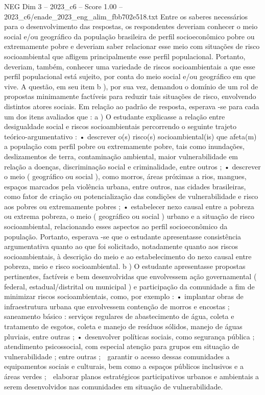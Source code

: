 \begin{textsample}{NEG Dim 3 – 2023\_c6 – Score 1.00 – 2023\_c6/enade\_2023\_eng\_alim\_fbb702e518.txt}
Entre os saberes necessários para o desenvolvimento das respostas, os respondentes deveriam conhecer o meio social e/ou geográfico da população brasileira de perfil socioeconômico pobre ou extremamente pobre e deveriam saber relacionar esse meio com situações de risco socioambiental que afligem principalmente esse perfil populacional.
Portanto, deveriam, também, conhecer uma variedade de riscos socioambientais a que esse perfil populacional está sujeito, por conta do meio social e/ou geográfico em que vive.
A questão, em seu item b ), por sua vez, demandou o domínio de um rol de propostas minimamente factíveis para reduzir tais situações de risco, envolvendo distintos atores sociais.
Em relação ao padrão de resposta, esperava -se para cada um dos itens avaliados que : a ) O estudante explicasse a relação entre desigualdade social e riscos socioambientais percorrendo o seguinte trajeto teórico-argumentativo : • descrever o(s) risco(s) socioambiental(is) que afeta(m) a população com perfil pobre ou extremamente pobre, tais como inundações, deslizamentos de terra, contaminação ambiental, maior vulnerabilidade em relação a doenças, discriminação social e criminalidade, entre outros ; • descrever o meio ( geográfico ou social ), como morros, áreas próximas a rios, mangues, espaços marcados pela violência urbana, entre outros, nas cidades brasileiras, como fator de criação ou potencialização das condições de vulnerabilidade e risco aos pobres ou extremamente pobres ; • estabelecer nexo causal entre a pobreza ou extrema pobreza, o meio ( geográfico ou social ) urbano e a situação de risco socioambiental, relacionando esses aspectos ao perfil socioeconômico da população.
Portanto, esperava -se que o estudante apresentasse consistência argumentativa quanto ao que foi solicitado, notadamente quanto aos riscos socioambientais, à descrição do meio e ao estabelecimento do nexo causal entre pobreza, meio e risco socioambiental. b ) O estudante apresentasse propostas pertinentes, factíveis e bem desenvolvidas que envolvessem ação governamental ( federal, estadual/distrital ou municipal ) e participação da comunidade a fim de minimizar riscos socioambientais, como, por exemplo : • implantar obras de infraestrutura urbana que envolvessem contenção de morros e encostas ; saneamento básico : serviços regulares de abastecimento de água, coleta e tratamento de esgotos, coleta e manejo de resíduos sólidos, manejo de águas pluviais, entre outras ; • desenvolver políticas sociais, como segurança pública ; atendimento psicossocial, com especial atenção para grupos em situação de vulnerabilidade ; entre outras ;  garantir o acesso dessas comunidades a equipamentos sociais e culturais, bem como a espaços públicos inclusivos e a áreas verdes ;  elaborar planos estratégicos participativos urbanos e ambientais a serem desenvolvidos nas comunidades em situação de vulnerabilidade.

\end{textsample}
